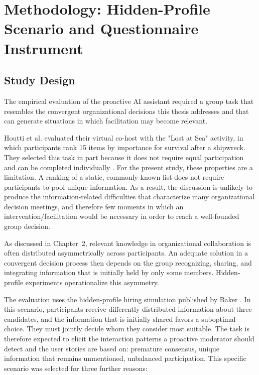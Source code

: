 \section{Methodology: Hidden-Profile Scenario and Questionnaire Instrument}

\subsection{Study Design}
The empirical evaluation of the proactive AI assistant required a group task that resembles the
convergent organizational decisions this thesis addresses and that can generate situations in which
facilitation may become relevant.

Houtti et al.\cite{houttiObserveAskIntervene2025} evaluated their virtual co-host with the "Lost at Sea"
activity, in which participants rank 15 items by importance for survival after a shipwreck.
They selected this task in part because it does not require equal participation and can be completed
individually \cite{houttiObserveAskIntervene2025}.
For the present study, these properties are a limitation.
A ranking of a static, commonly known list does not require participants to pool unique information.
As a result, the discussion is unlikely to produce the information-related difficulties that
characterize many organizational decision meetings, and therefore few moments in which an
intervention/facilitation would be necessary in order to reach a well-founded group decision.

As discussed in Chapter~2, relevant knowledge in organizational collaboration is often distributed
asymmetrically across participants.
An adequate solution in a convergent decision process then depends on the group recognizing,
sharing, and integrating information that is initially held by only some members.
Hidden-profile experiments operationalize this asymmetry.

The evaluation uses the hidden-profile hiring simulation published by Baker
\cite{bakerEnhancingGroupDecision2010}.
In this scenario, participants receive differently distributed information about three candidates,
and the information that is initially shared favors a suboptimal choice.
They must jointly decide whom they consider most suitable.
The task is therefore expected to elicit the interaction patterns a proactive moderator should
detect and the user stories are based on: premature consensus, unique information that remains unmentioned,
unbalanced participation.
This specific scenario was selected for three further reasons:

